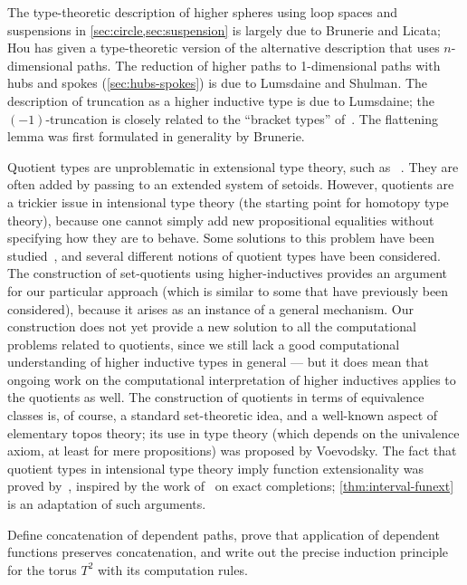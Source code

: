 The type-theoretic description of higher spheres using loop spaces and suspensions in \cref{sec:circle,sec:suspension} is largely due to  Brunerie and  Licata; Hou has given a type-theoretic version of the alternative description that uses $n$-dimensional paths.
The reduction of higher paths to 1-dimensional paths with hubs and spokes (\cref{sec:hubs-spokes}) is due to  Lumsdaine and  Shulman.
The description of truncation as a higher inductive type is due to  Lumsdaine; the $(-1)$-truncation is closely related to the ``bracket types'' of~\cite{ab:bracket-types}.
The flattening lemma was first formulated in generality by  Brunerie.

Quotient types are unproblematic in extensional type theory, such as \NuPRL~\cite{constable+86nuprl-book}.
They are often added by passing to an extended system of setoids.
However, quotients are a trickier issue in intensional type theory (the starting point for homotopy type theory), because one cannot simply add new propositional equalities without specifying how they are to behave. Some solutions to this problem have been studied~\cite{hofmann:thesis,Altenkirch1999,altenkirch+07ott}, and several different notions of quotient types have been considered.  The construction of set-quotients using higher-inductives provides an argument for our particular approach (which is similar to some that have previously been considered), because it arises as an instance of a general mechanism.  Our construction does not yet provide a new solution to all the computational problems related to quotients, since we still lack a good computational understanding of higher inductive types in general --- but it does mean that ongoing work on the computational interpretation of higher inductives applies to the quotients as well.  The construction of quotients in terms of equivalence classes is, of
course, a standard set-theoretic idea, and a well-known aspect of elementary topos theory; its use in type theory (which depends on the univalence axiom, at least for mere propositions) was proposed by Voevodsky.  The fact that quotient types in intensional type theory imply function extensionality was proved by~\cite{hofmann:thesis}, inspired by the work of~\cite{carboni} on exact completions; \cref{thm:interval-funext} is an adaptation of such arguments.

\sectionExercises

\begin{ex}\label{ex:torus}
  Define concatenation of dependent paths, prove that application of dependent functions preserves concatenation, and write out the precise induction principle for the torus $T^2$ with its computation rules.
\end{ex}

